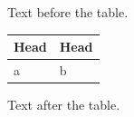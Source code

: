 \documentclass[12pt]{article}
\begin{document}
Text before the table.

\begin{tabular}{|l|l|}\hline\rowcolor{lightblue} Head & Head\\\hline a & \cellcolor[HTML]{FFE0C0}b\\\hline\end{tabular}

Text after the table.
\end{document}
